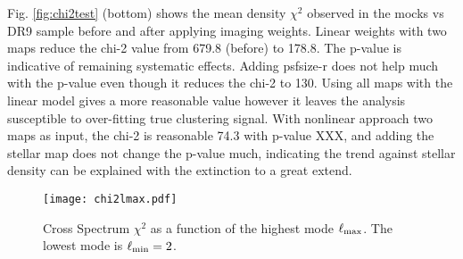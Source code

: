 Fig. \ref{fig:chi2test} (bottom) shows the mean density $\chi^{2}$ observed in the mocks vs DR9 sample before and after applying imaging weights. Linear weights with two maps reduce the chi-2 value from 679.8 (before) to 178.8. The p-value is indicative of remaining systematic effects. Adding psfsize-r does not help much with the p-value even though it reduces the chi-2 to 130. Using all maps with the linear model gives a more reasonable value however it leaves the analysis susceptible to over-fitting true clustering signal. With nonlinear approach two maps as input, the chi-2 is reasonable 74.3 with p-value XXX, and adding the stellar map does not change the p-value much, indicating the trend against stellar density can be explained with the extinction to a great extend. 

\begin{figure}
\centering
\texttt{[image: chi2lmax.pdf]}
\caption{Cross Spectrum $\chi^{2}$ as a function of the highest mode $\ell_{\rm max}$. The lowest mode is $\ell_{\rm min}=2$.}\label{fig:chi2cellextend}
\end{figure}